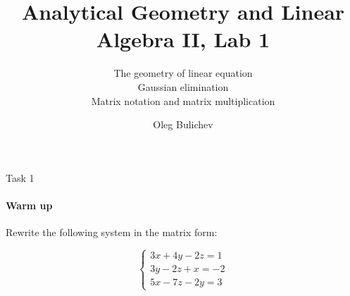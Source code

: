 \documentclass[aspectratio=169]{beamer}
\title[AGLA2]{Analytical Geometry and Linear Algebra II, Lab 1} %
\subtitle{The geometry of linear equation\\
          Gaussian elimination\\
          Matrix notation and matrix multiplication} %
\author{Oleg Bulichev}
\newcommand{\fbckg}[1]{\usebackgroundtemplate{\texttt{[image: \#1]}}}%
\begin{document}
\fbckg{fibeamer/figs/title_page.png}

\fbckg{fibeamer/figs/common.png}



\begin{frame}[t]{Task 1}
\framesubtitle{Warm up}
Rewrite the following system in the matrix form:
\begin{Large}
\begin{equation*}
    \left\{\begin{matrix}
       3x + 4y -2z = 1 \\ 
       3y -2z +x = -2 \\ 
       5x - 7z -2y = 3 
       \end{matrix}\right.
\end{equation*}
\end{Large}
\end{frame}
\end{document}
